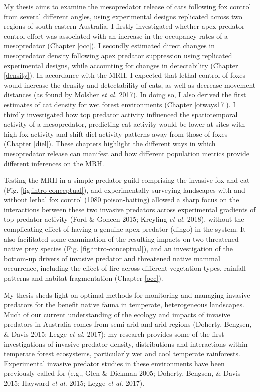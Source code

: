 \documentclass[11pt,a4paper,titlepage,twoside,openright]{style/unimelbthesis}
\begin{document}
\begin{mainmatter}
My thesis aims to examine the mesopredator release of cats following fox control from several different angles, using experimental designs replicated across two regions of south-eastern Australia. I firstly investigated whether apex predator control effort was associated with an increase in the occupancy rates of a mesopredator (Chapter \ref{occ}). I secondly estimated direct changes in mesopredator density following apex predator suppression using replicated experimental designs, while accounting for changes in detectability (Chapter \ref{density}). In accordance with the MRH, I expected that lethal control of foxes would increase the density and detectability of cats, as well as decrease movement distances (as found by Molsher \emph{et al.} 2017). In doing so, I also derived the first estimates of cat density for wet forest environments (Chapter \ref{otways17}). I thirdly investigated how top predator activity influenced the spatiotemporal activity of a mesopredator, predicting cat activity would be lower at sites with high fox activity and shift diel activity patterns away from those of foxes (Chapter \ref{diel}). These chapters highlight the different ways in which mesopredator release can manifest and how different population metrics provide different inferences on the MRH.

Testing the MRH in a simple predator guild comprising the invasive fox and cat (Fig. \ref{fig:intro-conceptual}), and experimentally surveying landscapes with and without lethal fox control (1080 poison-baiting) allowed a sharp focus on the interactions between these two invasive predators across experimental gradients of top predator activity (Ford \& Goheen 2015; Kreyling \emph{et al.} 2018), without the complicating effect of having a genuine apex predator (dingo) in the system. It also facilitated some examination of the resulting impacts on two threatened native prey species (Fig. \ref{fig:intro-conceptual}), and an investigation of the bottom-up drivers of invasive predator and threatened native mammal occurrence, including the effect of fire across different vegetation types, rainfall patterns and habitat fragmentation (Chapter \ref{occ}).

My thesis sheds light on optimal methods for monitoring and managing invasive predators for the benefit native fauna in temperate, heterogeneous landscapes. Much of our current understanding of the ecology and impacts of invasive predators in Australia comes from semi-arid and arid regions (Doherty, Bengsen, \& Davis 2015; Legge \emph{et al.} 2017); my research provides some of the first investigations of invasive predator density, distributions and interactions within temperate forest ecosystems, particularly wet and cool temperate rainforests. Experimental invasive predator studies in these environments have been previously called for (e.g., Glen \& Dickman 2005; Doherty, Bengsen, \& Davis 2015; Hayward \emph{et al.} 2015; Legge \emph{et al.} 2017).


\end{mainmatter}
\end{document}
